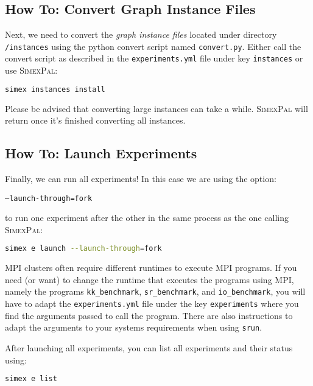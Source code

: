 \documentclass[11pt, a4paper]{scrartcl}
\newcommand{\expfile}{\texttt{experiments.yml} file\xspace}
\newcommand{\simex}{\textsc{Simex\-Pal}\xspace}
\begin{document}
\subsection{How To: Convert Graph Instance Files}\label{sec:getting_started:convert_instances}

Next, we need to convert the \textit{graph instance files} located under
directory \texttt{/instances} using the python convert script named
\texttt{convert.py}. Either call the convert script as described in the \expfile
under key \texttt{instances} or use \simex:

\begin{lstlisting}[language=bash]
simex instances install
\end{lstlisting}

Please be advised that converting large instances can take a while. \simex will
return once it's finished converting all instances.

\subsection{How To: Launch Experiments}\label{sec:getting_started:launch_experiments}

Finally, we can run all experiments! In this case we are using the option:

\texttt{---launch-through=fork}

\noindent to run one experiment after the other in the same process as the one
calling \simex:

\begin{lstlisting}[language=bash]
simex e launch --launch-through=fork
\end{lstlisting}

MPI clusters often require different runtimes to execute MPI programs. If you
need (or want) to change the runtime that executes the programs using MPI,
namely the programs \texttt{kk\_benchmark}, \texttt{sr\_benchmark}, and
\texttt{io\_benchmark}, you will have to adapt the \expfile under the key
\texttt{experiments} where you find the arguments passed to call the program.
There are also instructions to adapt the arguments to your systems requirements
when using \texttt{srun}.

After launching all experiments, you can list all experiments and their status
using:

\begin{lstlisting}[language=bash]
simex e list
\end{lstlisting}
\end{document}
